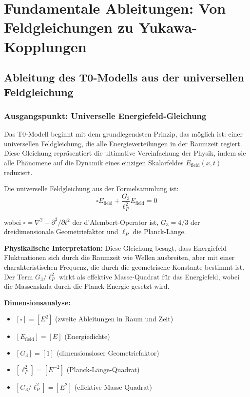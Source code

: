 \documentclass[12pt,a4paper]{article}
\newcommand{\Efield}{E_{\text{field}}}
\begin{document}
	\section{Fundamentale Ableitungen: Von Feldgleichungen zu Yukawa-Kopplungen}
	
	\subsection{Ableitung des T0-Modells aus der universellen Feldgleichung}
	
	\subsubsection{Ausgangspunkt: Universelle Energiefeld-Gleichung}
	
	Das T0-Modell beginnt mit dem grundlegendsten Prinzip, das möglich ist: einer universellen Feldgleichung, die alle Energieverteilungen in der Raumzeit regiert. Diese Gleichung repräsentiert die ultimative Vereinfachung der Physik, indem sie alle Phänomene auf die Dynamik eines einzigen Skalarfeldes $E_{\text{field}}(x,t)$ reduziert.
	
	Die universelle Feldgleichung aus der Formelsammlung ist:
	\begin{equation}
		\boxed{\square \Efield + \frac{G_3}{\ell_P^2} \Efield = 0}
	\end{equation}
	
	wobei $\square = \nabla^2 - \partial^2/\partial t^2$ der d'Alembert-Operator ist, $G_3 = 4/3$ der dreidimensionale Geometriefaktor und $\ell_P$ die Planck-Länge.
	
	\textbf{Physikalische Interpretation:} Diese Gleichung besagt, dass Energiefeld-Fluktuationen sich durch die Raumzeit wie Wellen ausbreiten, aber mit einer charakteristischen Frequenz, die durch die geometrische Konstante bestimmt ist. Der Term $G_3/\ell_P^2$ wirkt als effektive Masse-Quadrat für das Energiefeld, wobei die Massenskala durch die Planck-Energie gesetzt wird.
	
	\textbf{Dimensionsanalyse:}
	\begin{itemize}
		\item $[\square] = [E^2]$ (zweite Ableitungen in Raum und Zeit)
		\item $[\Efield] = [E]$ (Energiedichte)
		\item $[G_3] = [1]$ (dimensionsloser Geometriefaktor)
		\item $[\ell_P^2] = [E^{-2}]$ (Planck-Länge-Quadrat)
		\item $[G_3/\ell_P^2] = [E^2]$ (effektive Masse-Quadrat)
	\end{itemize}
	
\end{document}

